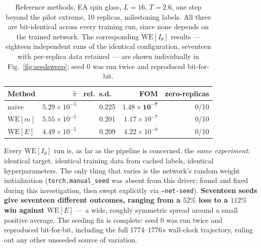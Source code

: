 \documentclass[a4paper,fleqn]{cas-sc}
\begin{document}
	\begin{table}[H]
		\centering\small
		\caption{Reference methods, EA spin glass, $L=16$, $T=2.6$, one step beyond the pilot
			extreme, 10 replicas, milestoning labels. All three are bit-identical across every
			training run, since none depends on the trained network. The corresponding
			$\mathrm{WE}[I_\theta]$ results --- eighteen independent runs of the identical
			configuration, seventeen with per-replica data retained --- are shown individually in
			Fig.~\ref{fig:seedsweep}; seed 0 was run twice and reproduced bit-for-bit.}
		\label{tab:milestone}
		\begin{tabular}{lrrrr}
			\toprule
			Method & $\hat\pi$ & rel.\ s.d.\ & FOM & zero-replicas \\
			\midrule
			naive & $5.29\times10^{-5}$ & 0.225 & $\mathbf{1.48\times10^{-7}}$ & 0/10 \\
			$\mathrm{WE}[m]$ & $5.55\times10^{-5}$ & 0.201 & $1.17\times10^{-7}$ & 0/10 \\
			$\mathrm{WE}[E]$ & $4.49\times10^{-5}$ & 0.209 & $4.22\times10^{-8}$ & 0/10 \\
			\bottomrule
		\end{tabular}
	\end{table}
	
	Every $\mathrm{WE}[I_\theta]$ run is, as far as the pipeline is concerned, the \emph{same
		experiment}: identical target, identical training data from cached labels, identical
	hyperparameters. The only thing that varies is the network's random weight initialization
	(\texttt{torch.manual\_seed} was absent from this driver; found and fixed during this
	investigation, then swept explicitly via \texttt{--net-seed}). \textbf{Seventeen seeds give
		seventeen different outcomes, ranging from a $52\%$ loss to a $112\%$ win against
		$\mathrm{WE}[E]$} --- a wide, roughly symmetric spread around a small positive average.
	The seeding fix is complete: seed 0 was run twice and reproduced bit-for-bit, including the
	full 1774--1776\,s wall-clock trajectory, ruling out any other unseeded source of variation.
	
\end{document}
